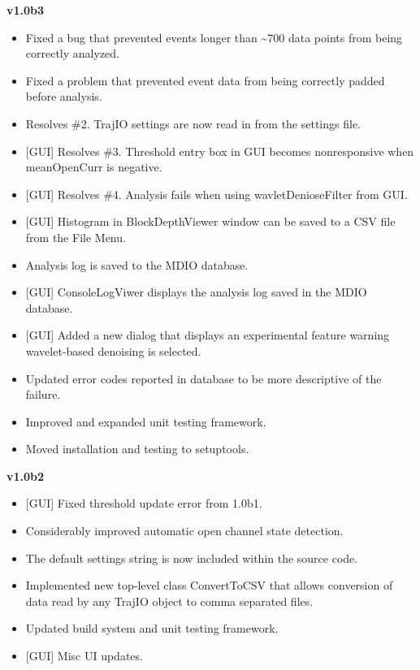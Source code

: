 \documentclass[letterpaper,10pt,english]{sphinxmanual}
\begin{document}
\textbf{v1.0b3}
\begin{itemize}
\item {} 
Fixed a bug that prevented events longer than \textasciitilde{}700 data points from being correctly analyzed.

\item {} 
Fixed a problem that prevented event data from being correctly padded before analysis.

\item {} 
Resolves \#2. TrajIO settings are now read in from the settings file.

\item {} 
{[}GUI{]} Resolves \#3. Threshold entry box in GUI becomes nonresponsive when meanOpenCurr is negative.

\item {} 
{[}GUI{]} Resolves \#4. Analysis fails when using wavletDenioseFilter from GUI.

\item {} 
{[}GUI{]} Histogram in BlockDepthViewer window can be saved to a CSV file from the File Menu.

\item {} 
Analysis log is saved to the MDIO database.

\item {} 
{[}GUI{]} ConsoleLogViwer displays the analysis log saved in the MDIO database.

\item {} 
{[}GUI{]} Added a new dialog that displays an experimental feature warning wavelet-based denoising is selected.

\item {} 
Updated error codes reported in database to be more descriptive of the failure.

\item {} 
Improved and expanded unit testing framework.

\item {} 
Moved installation and testing to setuptools.

\end{itemize}

\textbf{v1.0b2}
\begin{itemize}
\item {} 
{[}GUI{]} Fixed threshold update error from 1.0b1.

\item {} 
Considerably improved automatic open channel state detection.

\item {} 
The default settings string is now included within the source code.

\item {} 
Implemented new top-level class ConvertToCSV that allows conversion of data read by any TrajIO object to comma separated files.

\item {} 
Updated build system and unit testing framework.

\item {} 
{[}GUI{]} Misc UI updates.

\end{itemize}
\end{document}
